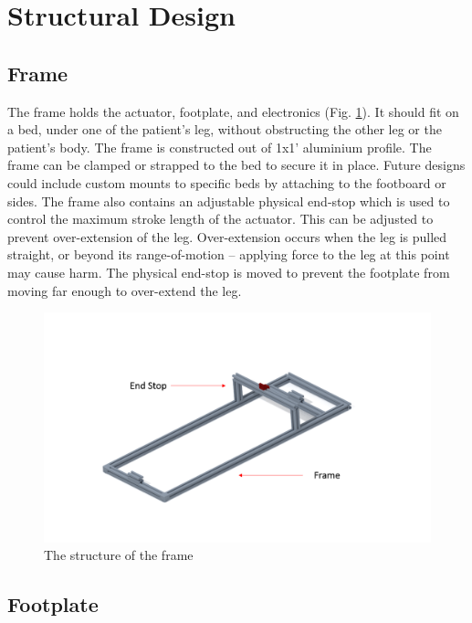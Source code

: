 \documentclass[12pt]{report}
\begin{document}
	
	\section{Structural Design}
	
	\subsection{Frame}

	The frame holds the actuator, footplate, and electronics (Fig. \ref{fig:frame}). It should fit on a bed, under one of the patient's leg, without obstructing the other leg or the patient's body. The frame is constructed out of 1x1' aluminium profile. The frame can be clamped or strapped to the bed to secure it in place. Future designs could include custom mounts to specific beds by attaching to the footboard or sides. The frame also contains an adjustable physical end-stop which is used to control the maximum stroke length of the actuator. This can be adjusted to prevent over-extension of the leg. Over-extension occurs when the leg is pulled straight, or beyond its range-of-motion -- applying force to the leg at this point may cause harm. The physical end-stop is moved to prevent the footplate from moving far enough to over-extend the leg. 
	

	\begin{figure}[h] 
		\centering
		\includegraphics[width=\linewidth]{frame}
		\caption{The structure of the frame}
		\label{fig:frame}
	\end{figure}
	
	
	
	\subsection{Footplate}
	
\end{document}
